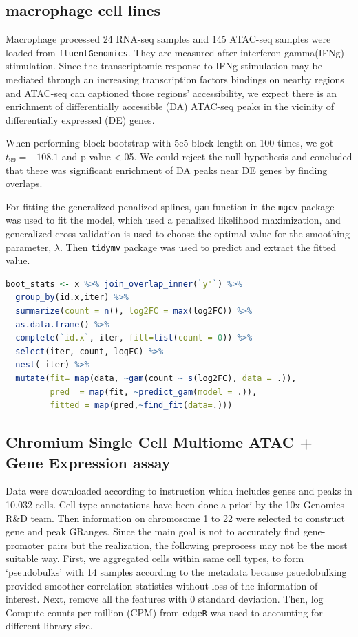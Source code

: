 \documentclass{article}
\newcommand{\code}[1]{\texttt{#1}}
\begin{document}
\subsection{macrophage cell lines}\label{sec:splines}
Macrophage processed 24 RNA-seq samples and 145 ATAC-seq samples were loaded from \code{fluentGenomics}\citep{lee2020fluent}. They are measured after interferon gamma(IFNg) stimulation. Since the transcriptomic response to IFNg stimulation may be mediated through an increasing transcription factors bindings on nearby regions and ATAC-seq can captioned those regions' accessibility, we expect there is an enrichment of differentially accessible (DA) ATAC-seq peaks in the vicinity of differentially expressed (DE) genes. 

When performing block bootstrap with 5e5 block length on 100 times, we got $t_{99}=-108.1$ and p-value <.05. We could reject the null hypothesis and concluded that there was significant enrichment of DA peaks near DE genes by finding overlaps.

For fitting the generalized penalized splines, \code{gam} function in the \code{mgcv} package was used to fit the model, which used a penalized likelihood maximization, and generalized cross-validation is used to choose the optimal value for the smoothing parameter, $\lambda$. Then \code{tidymv} package was used to predict and extract the fitted value. 

\begin{lstlisting}[language=R]
boot_stats <- x %>% join_overlap_inner(`y'`) %>%
  group_by(id.x,iter) %>%
  summarize(count = n(), log2FC = max(log2FC)) %>%
  as.data.frame() %>%
  complete(`id.x`, iter, fill=list(count = 0)) %>%
  select(iter, count, logFC) %>%
  nest(-iter) %>%
  mutate(fit= map(data, ~gam(count ~ s(log2FC), data = .)),
         pred  = map(fit, ~predict_gam(model = .)),
         fitted = map(pred,~find_fit(data=.)))

\end{lstlisting} 

\subsection{Chromium Single Cell Multiome ATAC + Gene Expression assay}
Data were downloaded according to \citet{Vignette} instruction which includes genes and peaks in 10,032 cells. Cell type annotations have been done a priori by the 10x Genomics R\&D team. Then information on chromosome 1 to 22 were selected to construct gene and peak GRanges. Since the main goal is not to accurately find gene-promoter pairs but the realization, the following preprocess may not be the most suitable way. First, we aggregated cells within same cell types, to form ‘pseudobulks’ with 14 samples according to the metadata because psuedobulking provided smoother correlation statistics without loss of the information of interest. Next, remove all the features with 0 standard deviation. Then, log Compute counts per million (CPM) from \code{edgeR} was used to accounting for different library size.
\end{document}
